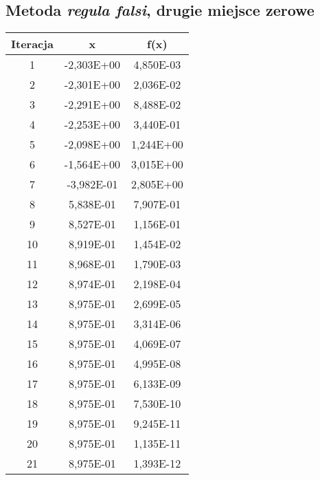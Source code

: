 \documentclass[12pt]{article}
\begin{document}
\subsection{Metoda \textit{regula falsi}, drugie miejsce zerowe}
\begin{table}[!htbp]
\centering
\begin{longtable}{|c|c|c|} 
    \hline
    \textbf{Iteracja} & \textbf{x} & \textbf{f(x)} \\
    \hline\hline
    1 & -2,303E+00  &	4,850E-03   \\ \hline
    2 & -2,301E+00  &	2,036E-02   \\ \hline
    3 & -2,291E+00  &	8,488E-02   \\ \hline
    4 & -2,253E+00  &	3,440E-01   \\ \hline
    5 & -2,098E+00  &	1,244E+00   \\ \hline
    6 & -1,564E+00  &	3,015E+00   \\ \hline
    7 & -3,982E-01  &	2,805E+00   \\ \hline
    8 & 5,838E-01   &	7,907E-01   \\ \hline
    9 & 8,527E-01   &	1,156E-01   \\ \hline
    10 & 8,919E-01   &	1,454E-02   \\ \hline
    11 & 8,968E-01   &	1,790E-03   \\ \hline
    12 & 8,974E-01   &	2,198E-04   \\ \hline
    13 & 8,975E-01   &	2,699E-05   \\ \hline
    14 & 8,975E-01   &	3,314E-06   \\ \hline
    15 & 8,975E-01   &	4,069E-07   \\ \hline
    16 & 8,975E-01   &	4,995E-08   \\ \hline
    17 & 8,975E-01   &	6,133E-09   \\ \hline
    18 & 8,975E-01   &	7,530E-10   \\ \hline
    19 & 8,975E-01   &	9,245E-11   \\ \hline
    20 & 8,975E-01   &	1,135E-11   \\ \hline
    21 & 8,975E-01   &	1,393E-12   \\ \hline
\end{longtable}
\label{table:samples3}
\end{table}
\FloatBarrier
\end{document}
